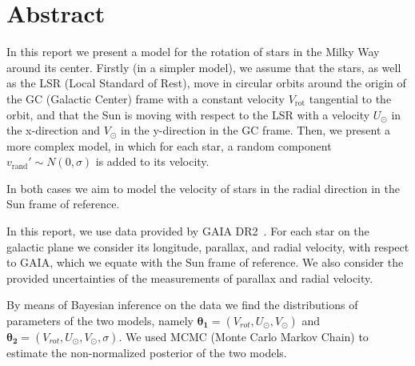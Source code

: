 \section*{Abstract}

In this report we present a model for the rotation of stars in the Milky Way around its center.
Firstly (in a simpler model), we assume that the stars, as well as the LSR (Local Standard of Rest), 
move in circular orbits around the origin of the GC (Galactic Center) frame 
with a constant velocity $V_{\text{rot}}$ tangential to the orbit,
and that the Sun is moving with respect to the LSR 
with a velocity $U_{\odot}$ in the x-direction and $V_{\odot}$ in the y-direction in the GC frame. 
Then, we present a more complex model, in which for each star, 
a random component $v_{\text{rand}}' \sim N(0, \sigma)$ is added to its velocity.


In both cases we aim to model the velocity of stars in the radial direction 
in the Sun frame of reference.

In this report, we use data provided by GAIA DR2~\cite{GAIADR2}.
For each star on the galactic plane we consider its longitude, parallax, and radial velocity,
with respect to GAIA, which we equate with the Sun frame of reference.
We also consider the provided uncertainties of the measurements of parallax and radial velocity.

By means of Bayesian inference on the data we find the distributions 
of parameters of the two models, 
namely $\mathbf{\theta_1} = (V_{rot}, U_{\odot}, V_{\odot})$ 
and $\mathbf{\theta_2} = (V_{rot}, U_{\odot}, V_{\odot}, \sigma)$.
We used MCMC (Monte Carlo Markov Chain) 
to estimate the non-normalized posterior of the two models. 

